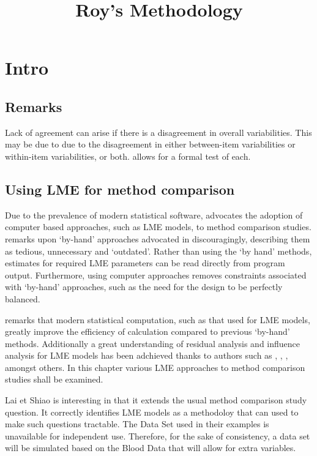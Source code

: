\documentclass[12pt, a4paper]{report}
\title{Roy's Methodology}
\author{ } \date{ }
\theoremstyle{plain}
\theoremstyle{definition}
\theoremstyle{remark}
\begin{document}
	\tableofcontents
	\newpage
\chapter{Intro}
\section{Remarks}
Lack of agreement can arise if there is a disagreement in overall variabilities. This may be due to due to the disagreement in either between-item
variabilities or within-item variabilities, or both. \citet{roy} allows for a formal test of each.
\section{Using LME for method comparison}
Due to the prevalence of modern statistical software, \citet{BXC2008} advocates the adoption of computer based approaches, such as LME models, to method comparison studies. \citet{BXC2008} remarks upon `by-hand' approaches advocated in \citet{BA99} discouragingly, describing them as tedious, unnecessary and `outdated'. Rather than using the `by hand' methods, estimates for required LME parameters can be read directly from program output. Furthermore, using computer approaches removes constraints associated with `by-hand' approaches, such as the need for the design to be perfectly balanced.

\citet{BXC2008} remarks that modern statistical computation, such as that used for LME models, greatly improve the efficiency of
calculation compared to previous `by-hand' methods. Additionally a great understanding of residual analysis and influence analysis for LME models has been adchieved thanks to authors such as \citet{schab}, \citet{CPJ}, \citet{cook86} \citet{west}, amongst others. In this chapter various LME approaches to method comparison studies shall
be examined.

Lai et Shiao is interesting in that it extends the usual method comparison study question. It correctly identifies LME models as a methodoloy that can used to make such questions tractable.
The Data Set used in their examples is unavailable for independent use. Therefore, for the sake of consistency, a data set will be simulated based on the Blood Data that will allow for extra variables.
\newpage
\end{document}
